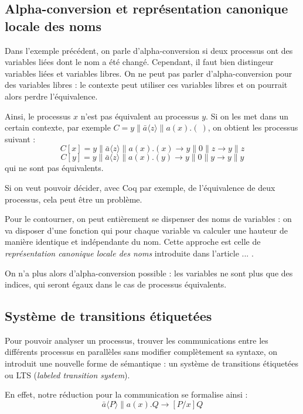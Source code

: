 \documentclass[11pt]{article}
\begin{document}
\subsection{Alpha-conversion et représentation canonique locale des noms}
Dans l'exemple précédent, on parle d'alpha-conversion si deux processus ont des variables liées dont le nom a été changé. Cependant, il faut bien distingeur variables liées et variables libres. On ne peut pas parler d'alpha-conversion pour des variables libres : le contexte peut utiliser ces variables libres et on pourrait alors perdre l'équivalence.

Ainsi, le processus $x$ n'est pas équivalent au processus $y$. Si on les met dans un certain contexte, par exemple $C = y\|\bar{a}\langle z\rangle\|a(x).(\ )$, on obtient les processus suivant : 
$$C[x] = y\|\bar{a}\langle z\rangle\|a(x).(x) \rightarrow y\|0\|z \rightarrow y\|z$$
$$C[y] = y\|\bar{a}\langle z\rangle\|a(x).(y) \rightarrow y\|0\|y \rightarrow y\|y$$
qui ne sont pas équivalents.

Si on veut pouvoir décider, avec Coq par exemple, de l'équivalence de deux processus, cela peut être un problème.

Pour le contourner, on peut entièrement se dispenser des noms de variables : on va disposer d'une fonction qui pour chaque variable va calculer une hauteur de manière identique et indépendante du nom. Cette approche est celle de \textit{représentation canonique locale des noms} introduite dans l'article ... .

On n'a plus alors d'alpha-conversion possible : les variables ne sont plus que des indices, qui seront égaux dans le cas de processus équivalents.


\subsection{Système de transitions étiquetées} %
Pour pouvoir analyser un processus, trouver les communications entre les différents processus en parallèles sans modifier complètement sa syntaxe, on introduit une nouvelle forme de sémantique : un système de transitions étiquetées ou LTS (\textit{labeled transition system}). 

En effet, notre réduction pour la communication se formalise ainsi :
$$\bar{a}\langle P\rangle\|a(x).Q \rightarrow [P/x]Q$$
\end{document}
